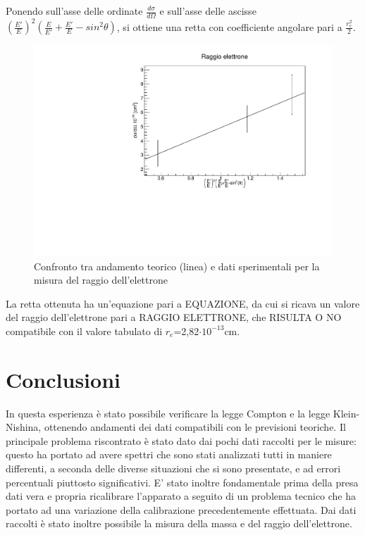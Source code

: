 \documentclass[italian,11pt]{report}
\begin{document}
Ponendo sull'asse delle ordinate $\frac{d\sigma}{d\Omega}$ e sull'asse delle ascisse $(\frac{E'}{E})^2(\frac{E}{E'}+\frac{E'}{E}-sin^2\theta)$, si ottiene una retta con coefficiente angolare pari a $\frac{r_{e}^{2}}{2}$. 
\begin{figure}[!htp]
\centering
\includegraphics[width=12cm]{raggioelettrone.pdf}
\caption{Confronto tra andamento teorico (linea) e dati sperimentali per la misura del raggio dell'elettrone}
\end{figure}
La retta ottenuta ha un'equazione pari a EQUAZIONE, da cui si ricava un valore del raggio dell'elettrone pari a RAGGIO ELETTRONE, che RISULTA O NO  compatibile con il valore tabulato di $r_{e}$=2,82$\cdot10^{-13}$cm.


\chapter{Conclusioni}
In questa esperienza è stato possibile verificare la legge Compton e la legge Klein-Nishina, ottenendo andamenti dei dati compatibili con le previsioni teoriche. Il principale problema riscontrato è stato dato dai pochi dati raccolti per le misure: questo ha portato ad avere spettri che sono stati analizzati tutti in maniere differenti, a seconda delle diverse situazioni che si sono presentate, e ad errori percentuali piuttosto significativi. E' stato inoltre fondamentale prima della presa dati vera e propria ricalibrare l'apparato a seguito di un problema tecnico che ha portato ad una variazione della calibrazione precedentemente effettuata. Dai dati raccolti è stato inoltre possibile la misura della massa e del raggio dell'elettrone.





\MakeBibliography
\end{document}
